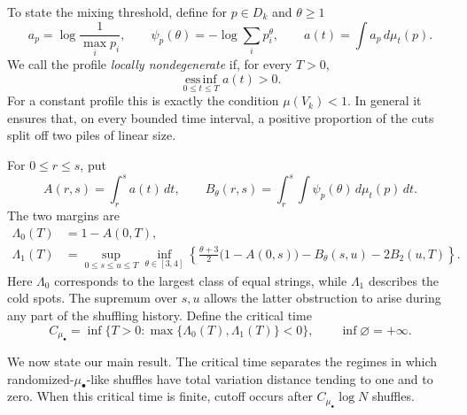 \documentclass[11pt]{article}
\numberwithin{equation}{section}
\theoremstyle{definition}
\theoremstyle{remark}
\newcommand{\1}{\mathbf 1}
\begin{document}
To state the mixing threshold, define for $p\in D_k$ and $\theta\ge1$
\begin{equation}\label{eq:intro-costs}
 a_p=\log\frac1{\max_i p_i},\qquad
 \psi_p(\theta)=-\log\sum_i p_i^\theta,
 \qquad a(t)=\int a_p\,d\mu_t(p).
\end{equation}
We call the profile \emph{locally nondegenerate} if, for every $T>0$,
\begin{equation}\label{eq:profile-nondegeneracy}
 \operatorname*{ess\,inf}_{0\le t\le T}a(t)>0.
\end{equation}
For a constant profile this is exactly the condition $\mu(V_k)<1$.
In general it ensures that, on every bounded time interval, a positive
proportion of the cuts split off two piles of linear size.

For $0\le r\le s$, put
\begin{equation}\label{eq:intro-integrated-costs}
 A(r,s)=\int_r^s a(t)\,dt,\qquad
 B_\theta(r,s)=\int_r^s\int\psi_p(\theta)\,d\mu_t(p)\,dt.
\end{equation}
The two margins are
\begin{align}
 \Lambda_0(T)&=1-A(0,T),\label{eq:intro-largest-margin}\\
 \Lambda_1(T)&=\sup_{0\le s\le u\le T}\inf_{\theta\in[3,4]}
 \left\{\frac{\theta+3}{2}\bigl(1-A(0,s)\bigr)
        -B_\theta(s,u)-2B_2(u,T)\right\}.
 \label{eq:intro-cold-margin}
\end{align}
Here $\Lambda_0$ corresponds to the largest class of equal strings,
while $\Lambda_1$ describes the cold spots. The supremum over $s,u$
allows the latter obstruction to arise during any part of the shuffling
history. Define the critical time
\begin{equation}\label{eq:profile-critical-time}
 C_{\mu_\bullet}
 =\inf\{T>0:\max\{\Lambda_0(T),\Lambda_1(T)\}<0\},
 \qquad \inf\varnothing=+\infty.
\end{equation}

We now state our main result. The critical time separates the regimes
in which randomized-$\mu_\bullet$-like shuffles have total variation
distance tending to one and to zero. When this critical time is finite,
cutoff occurs after $C_{\mu_\bullet}\log N$ shuffles.
\end{document}
